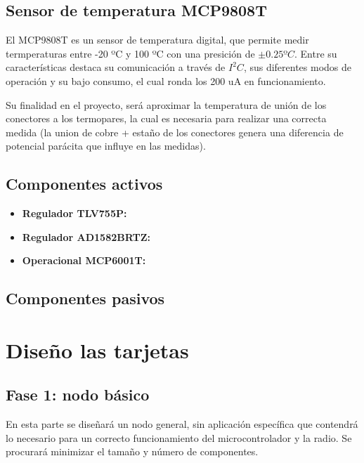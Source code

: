 	
	\subsection{Sensor de temperatura MCP9808T}
	
	El MCP9808T es un sensor de temperatura digital, que permite medir termperaturas entre -20 ºC y 100 ºC con una presición de  $\pm 0.25 ºC$. Entre su características destaca su comunicación a través de $I^2C$, sus diferentes modos de operación y su bajo consumo, el cual ronda los 200 uA en funcionamiento.
	
	Su finalidad en el proyecto, será aproximar la temperatura de unión de los conectores a los termopares, la cual es necesaria para realizar una correcta medida (la union de cobre + estaño de los conectores genera una diferencia de potencial parácita que influye en las medidas).
	
	\subsection{Componentes activos}
	
	
	\begin{itemize}
		\item \textbf{Regulador TLV755P: }
		
		\item \textbf{Regulador AD1582BRTZ: }
		
		\item \textbf{Operacional MCP6001T: }
	\end{itemize}
	
	\subsection{Componentes pasivos}
	
	
\section{Diseño las tarjetas}

	\subsection{Fase 1: nodo básico} 
	
		En esta parte se diseñará un nodo general, sin aplicación específica que contendrá lo necesario para un correcto funcionamiento del microcontrolador y la radio. Se procurará minimizar el tamaño y número de componentes.
		
